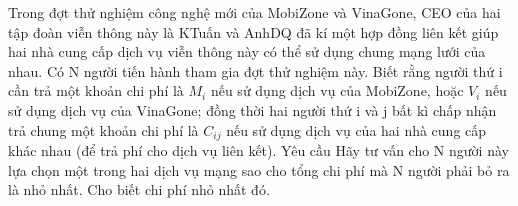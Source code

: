 Trong đợt thử nghiệm công nghệ mới của MobiZone và VinaGone, CEO của hai tập đoàn viễn thông này là KTuấn và AnhDQ đã kí một hợp đồng liên kết giúp hai nhà cung cấp dịch vụ viễn thông này có thể sử dụng chung mạng lưới của nhau. Có N người tiến hành tham gia đợt thử nghiệm này. Biết rằng người thứ i cần trả một khoản chi phí là $M_{i}$   nếu sử dụng dịch vụ của MobiZone, hoặc $V_{i}$   nếu sử dụng dịch vụ của VinaGone; đồng thời hai người thứ i và j bất kì chấp nhận trả chung một khoản chi phí là $C_{ij}$   nếu sử dụng dịch vụ của hai nhà cung cấp khác nhau (để trả phí cho dịch vụ liên kết).
   Yêu cầu  
Hãy tư vấn cho N người này lựa chọn một trong hai dịch vụ mạng sao cho tổng chi phí mà N người phải bỏ ra là nhỏ nhất. Cho biết chi phí nhỏ nhất đó.